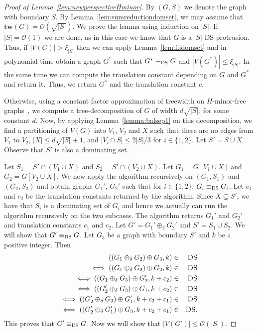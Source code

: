 \documentclass[11pt]{article}
\newcommand{\tw}{{\mathbf{tw}}}
\newcommand{\Hmf}{$H$-minor-free}
\newcommand{\tDS}{{\texttt{\sc DS}}}
\newcommand{\cO}{\mathcal{O}}
\begin{document}
\begin{proof}[Proof of Lemma~\ref{lem:newperspectiveHminor}]
By $(G,S)$ we denote the graph with boundary $S$. 
By Lemma~\ref{lem:sumreductiondomset},  we may assume that $\tw(G) = \cO(\sqrt{|S|})$. We prove the lemma using induction on $|S|$. 
If $|S|=\cO(1)$ we are done, as in this case we know that $G$ is a $|S|$-{\sc DS} protrusion. Thus, if $|V(G)|>\xi_{|S|}$ then 
 we can apply Lemma~\ref{lem:fiidomset} and in polynomial time obtain a graph $G^*$ such that $G^*\equiv_{\tDS} G$ and 
 $|V(G^*)|\leq \xi_{|S|}$. In the same time we can compute the translation constant depending on $G$ and $G^*$ 
 and return it. Thus, we return $G^*$  and the translation constant $c$. 
 



Otherwise, using a constant factor approximation of treewidth on \Hmf \, graphs~\cite{FeigeHajLee08}, we compute a tree-decomposition of $G$ of width $d\sqrt{|S|}$, for some constant $d$. Now, by applying Lemma~\ref{lemma:balsep1} on this decomposition, we find a partitioning of $V(G)$ into $V_1$, $V_2$ and $X$ such that there are no edges from $V_1$ to $V_2$, $|X| \leq d\sqrt{|S|}+1$, and $|V_i \cap S| \leq 2|S|/3$ for $i\in \{1,2\}$. Let 
$S' = S \cup X$. Observe that $S'$ is also a dominating set. 


Let $S_1=S' \cap (V_1 \cup X)$ and $S_2=S' \cap (V_2 \cup X)$.  Let $G_1=G[V_1 \cup X]$ and $G_2=G[V_2 \cup X]$. 
We now apply the algorithm recursively on 
$(G_1, S_1)$ and $(G_2, S_2)$ and obtain graphs 
$G_1'$, $G_2'$  such that for $i \in \{1,2\}$,  $G_{i}\equiv_{\tDS} G_i$. Let $c_1$ and $c_2$ be the translation 
constants returned by the algorithm.  Since $X \subseteq S'$, we have that $S_i$ is   a dominating set of $G_i$ and hence we actually can run the algorithm recursively on the two subcases. The algorithm returns $G_1'$ and $G_2'$ and translation constants $c_1$ and $c_2$. Let 
$G'=G_1'\oplus_\delta G_2'$ and $S'=S_1\cup S_2$.  We will show that $G'\equiv_{\tDS} G$. Let $G_3$ be a graph with boundary $S'$ and $k$ be a positive integer.  Then
\begin{eqnarray*}
((G_1\oplus_\delta G_2)\oplus G_3, k) & \in & \tDS \\
\iff  ((G_1\oplus_\delta G_3)\oplus G_2, k) & \in & \tDS \\
\iff  ((G_1\oplus_\delta G_3)\oplus G_2', k+c_2) & \in & \tDS \\
\iff  ((G_2'\oplus_\delta G_3)\oplus G_1, k+c_2) & \in & \tDS \\
\iff  ((G_2'\oplus_\delta G_3)\oplus G_1', k+c_2+c_1) & \in & \tDS \\
\iff  ((G_2'\oplus_\delta G_1')\oplus G_3, k+c_2+c_1) & \in & \tDS. \\
\end{eqnarray*}
This proves that $G'\equiv_{\tDS} G$.  Now we will show that  $|V(G')|\leq \cO(|S|)$. 


\end{proof}
\end{document}
